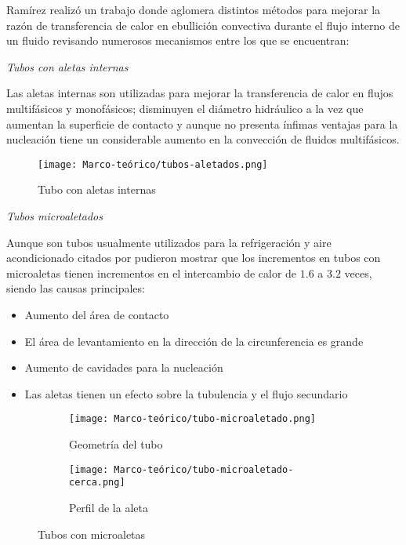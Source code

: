 			Ramírez \cite{ramirez_intensificacion_2018} realizó un trabajo donde aglomera distintos métodos para mejorar la razón de transferencia de calor en ebullición convectiva durante el flujo interno de un fluido revisando numerosos mecanismos entre los que se encuentran:

			\textit{Tubos con aletas internas}

				Las aletas internas son utilizadas para mejorar la transferencia de calor en flujos multifásicos y monofásicos; disminuyen el diámetro hidráulico a la vez que aumentan la superficie de contacto y aunque no presenta ínfimas ventajas para la nucleación tiene un considerable aumento en la convección de fluidos multifásicos.

				\begin{figure}[ht]
	\centering
	\texttt{[image: Marco-teórico/tubos-aletados.png]}
	\caption{Tubo con aletas internas}
	\label{fig:tubos-aletados}
\end{figure}

				\textit{Tubos microaletados}

				Aunque son tubos usualmente utilizados para la refrigeración y aire acondicionado \cites{wang_single-phase_1996}{greco_convective_2008} citados por \cite{ramirez_intensificacion_2018} pudieron mostrar que los incrementos en tubos con microaletas tienen incrementos en el intercambio de calor de $1.6$ a $3.2$ veces, siendo las causas principales:

				\begin{itemize}[columns = 2]
	\item Aumento del área de contacto
	\item El área de levantamiento en la dirección de la circunferencia es grande
	\item Aumento de cavidades para la nucleación
	\item Las aletas tienen un efecto sobre la tubulencia y el flujo secundario
\end{itemize}

				\begin{figure}[htb]
	\centering
	 \begin{subfigure}[H]{0.6\textwidth}
         \centering
         \texttt{[image: Marco-teórico/tubo-microaletado.png]}
         \caption{Geometría del tubo}
         \label{fig:tubo-microaletado}
     \end{subfigure}
     \hfill
     \begin{subfigure}[H]{0.3\textwidth}
         \centering
         \texttt{[image: Marco-teórico/tubo-microaletado-cerca.png]}
         \caption{Perfil de la aleta }
         \label{fig:tubo-microaletado-cerca}
     \end{subfigure}
	\caption{Tubos con microaletas}
	\label{fig:tubos-microaletados}
\end{figure}


